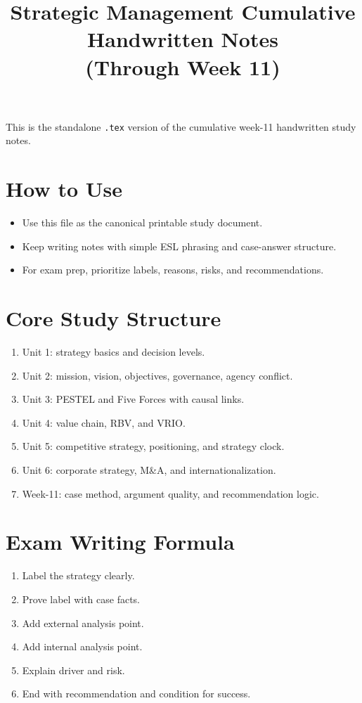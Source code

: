 \documentclass[11pt,a4paper]{article}
\title{Strategic Management Cumulative Handwritten Notes\\(Through Week 11)}
\author{}
\date{}
\begin{document}
\maketitle

This is the standalone \texttt{.tex} version of the cumulative week-11 handwritten study notes.

\section*{How to Use}
\begin{itemize}
  \item Use this file as the canonical printable study document.
  \item Keep writing notes with simple ESL phrasing and case-answer structure.
  \item For exam prep, prioritize labels, reasons, risks, and recommendations.
\end{itemize}

\section*{Core Study Structure}
\begin{enumerate}
  \item Unit 1: strategy basics and decision levels.
  \item Unit 2: mission, vision, objectives, governance, agency conflict.
  \item Unit 3: PESTEL and Five Forces with causal links.
  \item Unit 4: value chain, RBV, and VRIO.
  \item Unit 5: competitive strategy, positioning, and strategy clock.
  \item Unit 6: corporate strategy, M\&A, and internationalization.
  \item Week-11: case method, argument quality, and recommendation logic.
\end{enumerate}

\section*{Exam Writing Formula}
\begin{enumerate}
  \item Label the strategy clearly.
  \item Prove label with case facts.
  \item Add external analysis point.
  \item Add internal analysis point.
  \item Explain driver and risk.
  \item End with recommendation and condition for success.
\end{enumerate}
\end{document}
